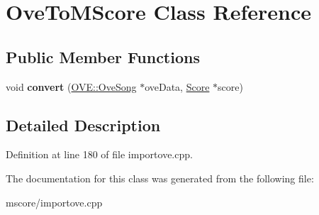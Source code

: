 \hypertarget{class_ove_to_m_score}{}\section{Ove\+To\+M\+Score Class Reference}
\label{class_ove_to_m_score}
\subsection*{Public Member Functions}
\begin{DoxyCompactItemize}
\item 
\mbox{\label{class_ove_to_m_score_af68ecd708574503d1591e5a557f6ed63}} 
void {\bfseries convert} (\hyperlink{class_o_v_e_1_1_ove_song}{O\+V\+E\+::\+Ove\+Song} $\ast$ove\+Data, \hyperlink{class_ms_1_1_score}{Score} $\ast$score)
\end{DoxyCompactItemize}


\subsection{Detailed Description}


Definition at line 180 of file importove.\+cpp.



The documentation for this class was generated from the following file\+:\begin{DoxyCompactItemize}
\item 
mscore/importove.\+cpp\end{DoxyCompactItemize}
